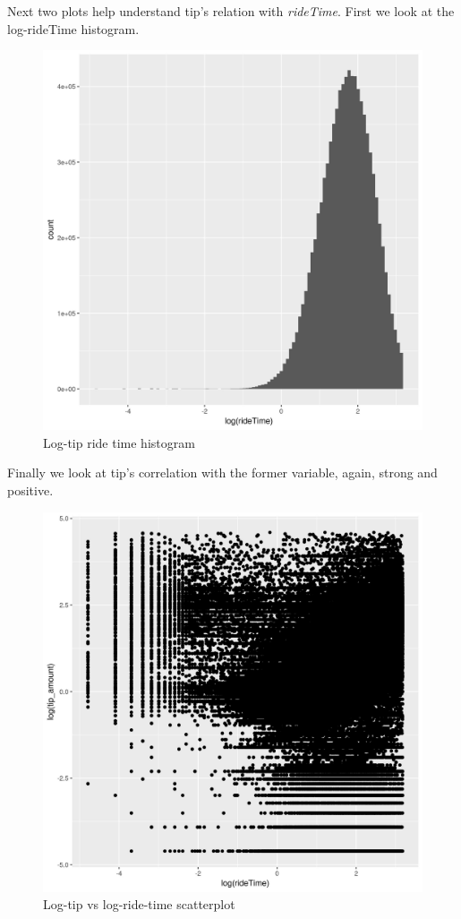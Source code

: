 \documentclass[11pt]{article}
\begin{document}
Next two plots help understand tip's relation with \emph{rideTime}.
First we look at the log-rideTime histogram.
\begin{figure}[htbp]
\centering
\includegraphics[width=.9\linewidth]{./plots/rideTimeHist.jpg}
\caption{\label{fig:orgc384038}
Log-tip ride time histogram}
\end{figure}

Finally we look at tip's correlation with the former variable, again,
strong and positive.
\begin{figure}[htbp]
\centering
\includegraphics[width=.9\linewidth]{./plots/rideTipPlot.jpg}
\caption{\label{fig:orgab92c8d}
Log-tip vs log-ride-time scatterplot}
\end{figure}
\end{document}
